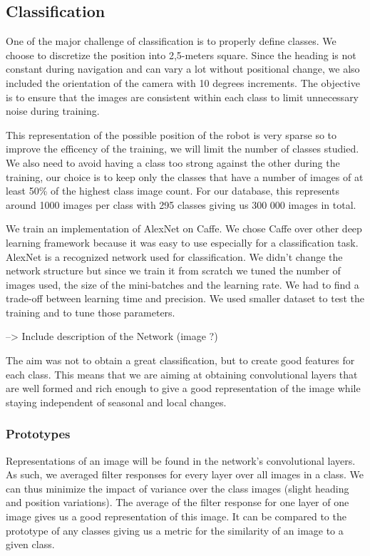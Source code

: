 \subsection{Classification}

One of the major challenge of classification is to properly define classes. We choose to discretize the position into 2,5-meters square. Since the heading is not constant during navigation and can vary a lot without positional change, we also included the orientation of the camera with 10 degrees increments. The objective is to ensure that the images are consistent within each class to limit unnecessary noise during training. 

This representation of the possible position of the robot is very sparse so to improve the efficency of the training, we will limit the number of classes studied. We also need to avoid having a class too strong against the other during the training, our choice is to keep only the classes that have a number of images of at least 50\% of the highest class image count. For our database, this represents around 1000 images per class with 295 classes giving us 300 000 images in total.

We train an implementation of AlexNet on Caffe. We chose Caffe over other deep learning framework because it was easy to use especially for a classification task. AlexNet is a recognized network used for classification. We didn't change the network structure but since we train it from scratch we tuned the number of images used, the size of the mini-batches and the learning rate. We had to find a trade-off between learning time and precision. We used smaller dataset to test the training and to tune those parameters.

--> Include description of the Network (image ?)

The aim was not to obtain a great classification, but to create good features for each class. This means that we are aiming at obtaining convolutional layers that are well formed and rich enough to give a good representation of the image while staying independent of seasonal and local changes.

\subsubsection{Prototypes}
Representations of an image will be found in the network's convolutional layers. As such, we averaged filter responses for every layer over all images in a class. We can thus minimize the impact of variance over the class images (slight heading and position variations). The average of the filter response for one layer of one image gives us a good representation of this image. It can be compared to the prototype of any classes giving us a metric for the similarity of an image to a given class. 
